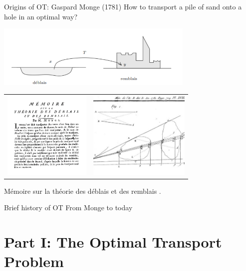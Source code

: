 \documentclass[pdf,aspectratio=169,10pt]{beamer}
\begin{document}
\begin{frame}{Origins of OT: Gaspard Monge (1781)}
How to transport a pile of sand onto a hole in an optimal way?

  \begin{center}
  \includegraphics[height=3cm]{../img/deblais}\vspace{0.2cm}
  \begin{tabular}{cc}
\includegraphics[height=4.2cm]{../img/monge0}& \includegraphics[height=4.2cm]{../img/monge1781} \\
  \end{tabular}
  
  \end{center}
{\tiny Mémoire sur la théorie des déblais et des remblais \cite{monge1781memoire}.}
\end{frame}


\begin{frame}{Brief history of OT}
    From Monge to today
\end{frame}

\section{Part I: The Optimal Transport Problem}


\begin{frame}
    \Large {}
\end{frame}
\end{document}
